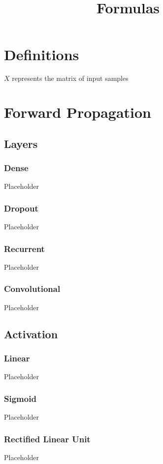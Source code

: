 \documentclass[a4paper]{article}
\title{\vspace{-1in}Formulas}
\author{}
\date{}
\begin{document}
\maketitle
\vspace{-0.5in}

\section*{Definitions}

$X$ represents the matrix of input samples

\section*{Forward Propagation}

\subsection*{Layers}
\subsubsection*{Dense}
Placeholder
\subsubsection*{Dropout}
Placeholder
\subsubsection*{Recurrent}
Placeholder
\subsubsection*{Convolutional}
Placeholder

\subsection*{Activation}
\subsubsection*{Linear}
Placeholder
\subsubsection*{Sigmoid}
Placeholder
\subsubsection*{Rectified Linear Unit}
Placeholder
\end{document}
